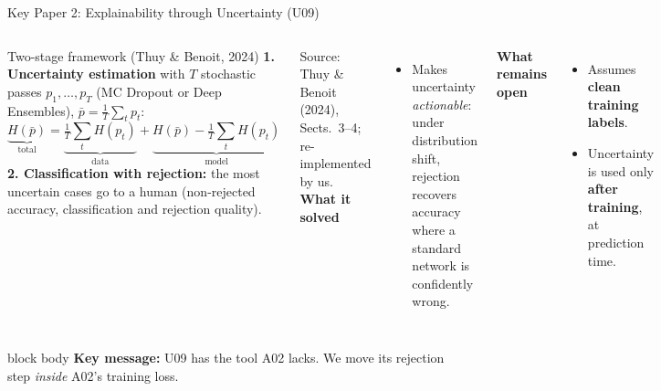 \documentclass[aspectratio=169,11pt,professionalfonts]{beamer}
\newcommand{\keymsg}[1]{%
  \begin{beamercolorbox}[wd=\linewidth,rounded=true,sep=0.6em]{block body}
  \textbf{Key message:} #1
  \end{beamercolorbox}
}
\newcommand{\src}[1]{{\scriptsize\color{softGray}#1}}
\newcommand{\pbar}{\bar p}
\begin{document}
\begin{frame}[t]{Key Paper 2: Explainability through Uncertainty (U09)}
\begin{columns}[T,totalwidth=\textwidth]
\begin{block}{Two-stage framework (Thuy \& Benoit, 2024)}
\footnotesize
\textbf{1. Uncertainty estimation} with $T$ stochastic passes $p_1,\dots,p_T$ (MC Dropout or Deep Ensembles),
$\pbar=\tfrac1T\sum_t p_t$:
\vspace{-0.5em}
\[
\underbrace{H(\pbar)}_{\text{total}}=\underbrace{\tfrac1T\textstyle\sum_t H(p_t)}_{\text{data}}
+\underbrace{H(\pbar)-\tfrac1T\textstyle\sum_t H(p_t)}_{\text{model}}
\]
\textbf{2. Classification with rejection:} the most uncertain cases go to a human (non-rejected accuracy,
classification and rejection quality).
\end{block}
\src{Source: Thuy \& Benoit (2024), Sects.\ 3--4; re-implemented by us.}
\small
\textbf{What it solved}
\begin{itemize}\footnotesize
  \item Makes uncertainty \emph{actionable}: under distribution shift, rejection recovers accuracy where a
  standard network is confidently wrong.
\end{itemize}
\textbf{What remains open}
\begin{itemize}\footnotesize
  \item Assumes \textbf{clean training labels}.
  \item Uncertainty is used only \textbf{after training}, at prediction time.
\end{itemize}
\end{columns}
\vspace{0.5em}
\keymsg{U09 has the tool A02 lacks. We move its rejection step \emph{inside} A02's training loss.}
\end{frame}
\end{document}
